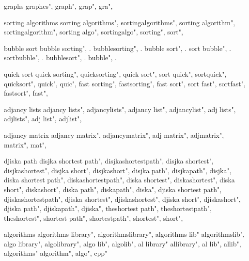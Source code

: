          graphs 
        graphes", 
        graph", 
        grap", 
        gra", 
        
         sorting algorithms 
        sorting algorithms",  
        sortingalgorithms",  
        sorting algorithm",  
        sortingalgorithm",  
        sorting algo",  
        sortingalgo",  
        sorting",  
        sort",  
        
         bubble sort 
        bubble sorting", . 
        bubblesorting", . 
        bubble sort", . 
        sort bubble", . 
        sortbubble", . 
        bubblesort", . 
        bubble", . 
        
         quick sort 
        quick sorting",  
        quicksorting",  
        quick sort",  
        sort quick",  
        sortquick",  
        quicksort",  
        quick",  
        quic",  
        fast sorting",  
        fastsorting",  
        fast sort",  
        sort fast",  
        sortfast",  
        fastsort",  
        fast",  
        
         adjancy lists
        adjancy lists",  
        adjancylists",  
        adjancy list",  
        adjancylist",  
        adj lists",  
        adjlists",  
        adj list",  
        adjlist",  
        
         adjancy matrix 
        adjancy matrix",  
        adjancymatrix",  
        adj matrix",  
        adjmatrix",  
        matrix",  
        mat",  
        
         djiska path 
        disjka shortest path",  
        disjkashortestpath",  
        disjka shortest",  
        disjkashortest",  
        disjka short",  
        disjkashort",  
        disjka path",  
        disjkapath",  
        disjka",  
        diska shortest path",  
        diskashortestpath",  
        diska shortest",  
        diskashortest",  
        diska short",  
        diskashort",  
        diska path",  
        diskapath",  
        diska",  
        djiska shortest path",  
        djiskashortestpath",  
        djiska shortest",  
        djiskashortest",  
        djiska short",  
        djiskashort",  
        djiska path",  
        djiskapath",  
        djiska",  
        theshortest path",  
        theshortestpath",  
        theshortest",  
        shortest path",  
        shortestpath",  
        shortest",  
        short",  
        
         algorithms 
        algorithms library",
        algorithmslibrary", 
        algorithms lib"
        algorithmslib",
        algo library", 
        algolibrary",
        algo lib", 
        algolib",
        al library"
        allibrary",
        al lib",
        allib",
        algorithms"
        algorithm",
        algo", cpp"
        
